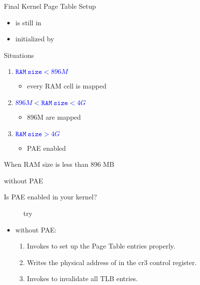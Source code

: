 \begin{frame}{Final Kernel Page Table Setup}
  \begin{itemize}
  \item {} is still in 
  \item initialized by 
  \end{itemize}
  
  \begin{block}{Situations}
    \begin{enumerate}
    \item \textcolor{blue}{$\mathtt{RAM\ size} < 896M$}
      \begin{itemize}
      \item every RAM cell is mapped
      \end{itemize}
    \item \textcolor{blue}{$896M < \mathtt{RAM\ size} < 4G$}
      \begin{itemize}
      \item 896M are mapped
      \end{itemize}
    \item \textcolor{blue}{$\mathtt{RAM\ size} > 4G$}
      \begin{itemize}
      \item PAE enabled
      \end{itemize}
    \end{enumerate}
  \end{block}
\end{frame}

\begin{frame}{When RAM size is less than 896 MB}%
  \begin{block}{ without PAE}
    \begin{center}
       
    \end{center}
  \end{block}
\end{frame}

\begin{description}
\item[Is PAE enabled in your kernel?] try 
\end{description}

\begin{itemize}
\item \noindent{} without PAE:
  \begin{enumerate}
  \item Invokes  to set up the Page Table entries properly.
  \item Writes the physical address of  in the cr3 control register.
  \item Invokes  to invalidate all TLB entries.
  \end{enumerate}
\end{itemize}

